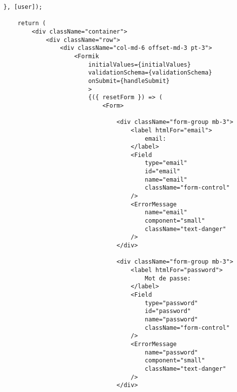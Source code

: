\documentclass[10pt,a4paper]{article}
\begin{document}
\begin{verbatim}
}, [user]);

    return (
        <div className="container">
            <div className="row">
                <div className="col-md-6 offset-md-3 pt-3">
                    <Formik
                        initialValues={initialValues}
                        validationSchema={validationSchema}
                        onSubmit={handleSubmit}
                        >
                        {({ resetForm }) => (
                            <Form>
                                
                                <div className="form-group mb-3">
                                    <label htmlFor="email">
                                        email:
                                    </label>
                                    <Field
                                        type="email"
                                        id="email"
                                        name="email"
                                        className="form-control"
                                    />
                                    <ErrorMessage
                                        name="email"
                                        component="small"
                                        className="text-danger"
                                    />
                                </div>
                              
                                <div className="form-group mb-3">
                                    <label htmlFor="password">
                                        Mot de passe:
                                    </label>
                                    <Field
                                        type="password"
                                        id="password"
                                        name="password"
                                        className="form-control"
                                    />
                                    <ErrorMessage
                                        name="password"
                                        component="small"
                                        className="text-danger"
                                    />
                                </div>
                               

\end{verbatim}
\end{document}
